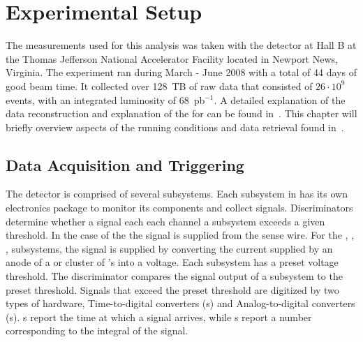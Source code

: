 \section{\label{sec:level1}Experimental Setup}
The measurements used for this analysis was taken with the  detector at Hall B at the Thomas Jefferson National Accelerator Facility  located in Newport News, Virginia. The  experiment ran during March - June 2008 with a total of 44 days of good beam time. It collected over 128~TB of raw data that consisted of $26\cdot 10^9$ events, with an integrated luminosity of 68~pb$^{-1}$. A detailed explanation of the  data reconstruction and explanation of the  for  can be found in~\cite{clas.g12.note}. This chapter will briefly overview aspects of the  running conditions and data retrieval found in~\cite{clas.g12.note}.
\subsection{ Data Acquisition and Triggering  }\label{sec:clas.g12.conditions.data}

The \clas  detector is comprised of several subsystems. Each subsystem in \clas has its own electronics package to monitor its components and collect signals. Discriminators determine whether a signal each each channel a subsystem exceeds a given threshold. In the case of the  the signal is supplied from the sense wire. For the , , ,  subsystems, the signal is supplied by converting the current supplied by an anode of a  or cluster of 's into a voltage. Each subsystem has a preset voltage threshold. The discriminator compares the signal output of a subsystem to the preset threshold. Signals that exceed the preset threshold are digitized by two types of hardware, Time-to-digital converters (s) and Analog-to-digital converters (s). s report the time at which a signal arrives, while s report a number corresponding to the integral of the signal.

